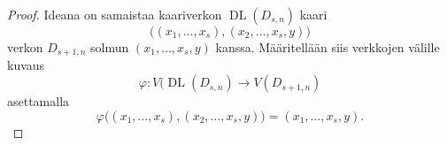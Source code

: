 \documentclass[finnish]{tktltiki2}
\theoremstyle{definition}
\theoremstyle{remark}
\DeclareMathOperator{\DL}{DL}
\newcommand{\Dsn}{D_{s,n}}
\newcommand{\Dssn}{D_{s+1,n}}
\begin{document}
\begin{proof}
    Ideana on samaistaa kaariverkon $\DL(\Dsn)$ kaari
    \begin{equation*}
        \big(
            (x_1, \dots, x_s), (x_2, \dots, x_s, y)
        \big)
    \end{equation*}
    verkon $\Dssn$ solmun $(x_1, \dots, x_s, y)$ kanssa. Määritellään
    siis verkkojen vä\-lil\-le kuvaus
    \begin{equation*}
        \varphi \colon V(\DL(\Dsn) \to V(D_{s + 1, n})
    \end{equation*}
    asettamalla
    \begin{equation*}
        \varphi\big(
                   (x_1, \dots, x_s), (x_2, \dots, x_s, y)
               \big) = (x_1, \dots, x_s, y).
    \end{equation*}


\end{proof}
\end{document}
